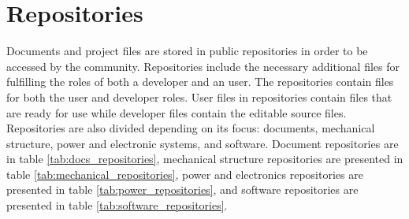 \documentclass{article}
\begin{document}
\newpage
\section{Repositories}
Documents and project files are stored in public repositories in order to be accessed by the community. Repositories include the necessary additional files for fulfilling the roles of both a developer and an user. The repositories contain files for both the user and developer roles. User files in repositories contain files that are ready for use while developer files contain the editable source files. Repositories are also divided depending on its focus: documents, mechanical structure, power and electronic systems, and software. Document repositories are in table \ref{tab:docs_repositories}, mechanical structure repositories are presented in table \ref{tab:mechanical_repositories}, power and electronics repositories are presented in table \ref{tab:power_repositories}, and software repositories are presented in table \ref{tab:software_repositories}.
\end{document}
